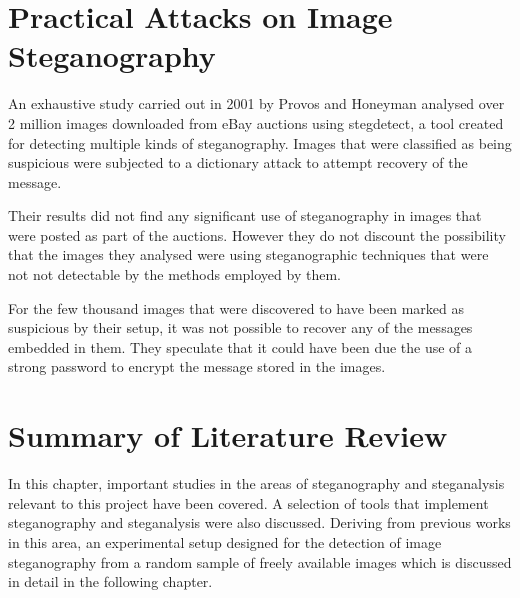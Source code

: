 \section{Practical Attacks on Image Steganography}
\label{sec:practical}
An exhaustive study carried out in 2001 by Provos and Honeyman \cite{provos2001detecting} analysed over 2 million images downloaded from eBay auctions using stegdetect, a tool created for detecting multiple kinds of steganography. Images that were classified as being suspicious were subjected to a dictionary attack to attempt recovery of the message.
\par Their results did not find any significant use of steganography in images that were posted as part of the auctions. However they do not discount the possibility that the images they analysed were using steganographic techniques that were not not detectable by the methods employed by them.
\par For the few thousand images that were discovered to have been marked as suspicious by their setup, it was not possible to recover any of the messages embedded in them.  They speculate that it could have been due the use of a strong password to encrypt the message stored in the images.

\section{Summary of Literature Review}
\label{sec:summarybg}
In this chapter, important studies in the areas of steganography and steganalysis relevant to this project have been covered. A selection of tools that implement steganography and steganalysis were also discussed.  Deriving from previous works in this area, an experimental setup designed for the detection of image steganography from a random sample of freely available images which is discussed in detail in the following chapter.
